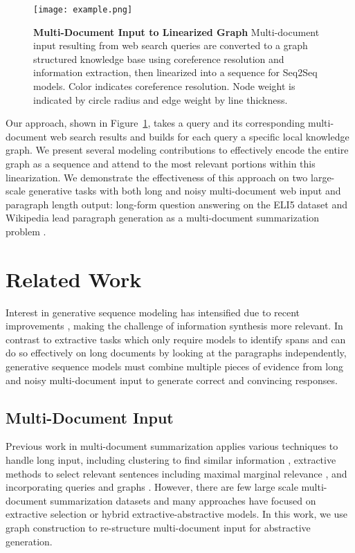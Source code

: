 \documentclass[11pt,a4paper]{article}
\begin{document}
\begin{figure}[t!]
    \centering
    \texttt{[image: example.png]}
    \caption{\textbf{Multi-Document Input to Linearized Graph} Multi-document input resulting from web search queries are converted to a graph structured knowledge base using coreference resolution and information extraction, then linearized into a sequence for Seq2Seq models. Color indicates coreference resolution. Node weight is indicated by circle radius and edge weight by line thickness.}
    \label{fig:example}
\end{figure}

Our approach, shown in Figure~\ref{fig:example}, takes a query and its corresponding multi-document web search results and builds for each query a specific local knowledge graph. We present several modeling contributions to effectively encode the entire graph as a sequence and attend to the most relevant portions within this linearization. We demonstrate the effectiveness of this approach on two large-scale generative tasks with both long and noisy multi-document web input and paragraph length output: long-form question answering on the ELI5 dataset \cite{fan2019explain} and Wikipedia lead paragraph generation as a multi-document summarization problem \cite{liu2018generating}. 

\section{Related Work} 

Interest in generative sequence modeling has intensified due to recent improvements \cite{peters2018deep,devlin2018bert,radford2019language}, making the challenge of information synthesis more relevant. In contrast to extractive tasks which only require models to identify spans and can do so effectively on long documents by looking at the paragraphs independently, generative sequence models must combine multiple pieces of evidence from long and noisy multi-document input to generate correct and convincing responses.

\subsection{Multi-Document Input}

Previous work in multi-document summarization \cite{barzilay1999information} applies various techniques to handle long input, including clustering to find similar information \cite{honarpisheh2008multi}, extractive methods to select relevant sentences \cite{daume2002noisy,gillick2009scalable,berg2011jointly,di2014hybrid,bing2015abstractive,cao2017improving} including maximal marginal relevance \cite{fabbri2019multi}, and incorporating queries \cite{baumel2018query} and graphs \cite{ganesan2010opinosis,yasunaga2017graph}. However, there are few large scale multi-document summarization datasets and many approaches have focused on extractive selection or hybrid extractive-abstractive models. In this work, we use graph construction to re-structure multi-document input for abstractive generation. 
\end{document}
